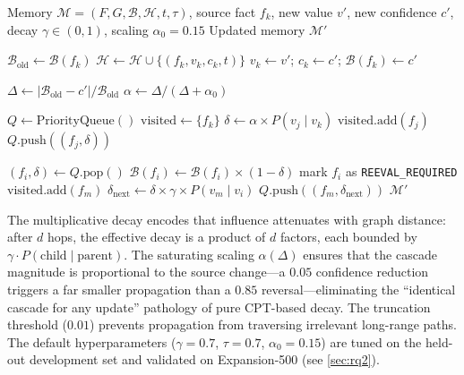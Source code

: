 \documentclass{article}
\theoremstyle{definition}
\begin{document}
\begin{algorithm}[t]
\caption{NTM-BP: Belief Propagation for Memory Updates}
\label{alg:ntmbp}
\begin{algorithmic}[1]
\Require Memory $\mathcal{M}=(F,G,\mathcal{B},\mathcal{H},t,\tau)$, source
  fact $f_k$, new value $v'$, new confidence $c'$, decay $\gamma\in(0,1)$,
  scaling $\alpha_0=0.15$
\Ensure Updated memory $\mathcal{M}'$

\State $\mathcal{B}_{\text{old}}\gets\mathcal{B}(f_k)$
\State $\mathcal{H}\gets\mathcal{H}\cup\{(f_k,v_k,c_k,t)\}$
\State $v_k\gets v'$; $c_k\gets c'$; $\mathcal{B}(f_k)\gets c'$

\State $\Delta\gets|\mathcal{B}_{\text{old}} - c'|/\mathcal{B}_{\text{old}}$
\State $\alpha\gets\Delta/(\Delta+\alpha_0)$

\State $Q\gets\text{PriorityQueue}()$
\State $\text{visited}\gets\{f_k\}$
  \State $\delta\gets\alpha\times P(v_j\mid v_k)$
    \State $\text{visited}.\text{add}(f_j)$
    \State $Q.\text{push}((f_j,\delta))$
  \EndIf
\EndFor

  \State $(f_i,\delta)\gets Q.\text{pop}()$
  \State $\mathcal{B}(f_i)\gets\mathcal{B}(f_i)\times(1-\delta)$
    \State mark $f_i$ as \texttt{REEVAL\_REQUIRED}
  \EndIf
      \State $\text{visited}.\text{add}(f_m)$
      \State $\delta_{\text{next}}\gets\delta\times\gamma\times P(v_m\mid v_i)$
        \State $Q.\text{push}((f_m,\delta_{\text{next}}))$
      \EndIf
    \EndIf
  \EndFor
\EndWhile
\State \Return $\mathcal{M}'$
\end{algorithmic}
\end{algorithm}

The multiplicative decay encodes that influence attenuates with graph
distance: after $d$ hops, the effective decay is a product of $d$
factors, each bounded by $\gamma\cdot P(\text{child}\mid\text{parent})$.
The saturating scaling $\alpha(\Delta)$ ensures that the cascade magnitude
is proportional to the source change---a $0.05$ confidence reduction
triggers a far smaller propagation than a $0.85$ reversal---eliminating
the ``identical cascade for any update'' pathology of pure CPT-based
decay.  The truncation threshold ($0.01$) prevents propagation from
traversing irrelevant long-range paths.  The default hyperparameters
($\gamma=0.7$, $\tau=0.7$, $\alpha_0=0.15$) are tuned on the held-out
development set and validated on Expansion-500 (see \cref{sec:rq2}).
\end{document}
